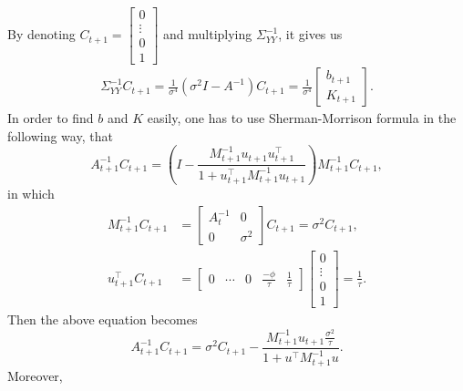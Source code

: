 By denoting $C_{t+1} = \left[ \begin{array}{c} 0\\\vdots \\ 0 \\ 1\end{array} \right]$ and multiplying $\Sigma_{YY}^{-1}$, it gives us
\begin{align*}
\Sigma_{YY}^{-1} C_{t+1}= \frac{1}{\sigma^4}(\sigma^2 I-A^{-1}) C_{t+1}= \frac{1}{\sigma^4} \left[\begin{matrix} b_{t+1} \\ K_{t+1} \end{matrix} \right].
\end{align*} 
In order to find $b$ and $K$ easily, one has to use Sherman-Morrison formula in the following way, that
\begin{equation}
A_{t+1}^{-1}C_{t+1} = \left( I - \frac{M_{t+1}^{-1}u_{t+1}u_{t+1}^\top }{1+u_{t+1}^\top M_{t+1}^{-1} u_{t+1}} \right)M_{t+1}^{-1}C_{t+1},
\end{equation}
in which
\begin{align*}
M_{t+1}^{-1}C_{t+1}    &=\left[ \begin{array}{cc} A_{t}^{-1} & 0 \\ 0 & \sigma^2 \end{array} \right]C_{t+1}=\sigma^2 C_{t+1},\\
u_{t+1}^\top C_{t+1} & = \left[ \begin{array}{ccccc} 0 & \cdots & 0 &\frac{-\phi}{\tau} & \frac{1}{\tau} \end{array} \right] \left[ \begin{array}{c} 0 \\ \vdots \\ 0\\ 1 \end{array} \right]= \frac{1}{\tau}.
\end{align*}
Then the above equation becomes
\begin{equation}
A_{t+1}^{-1}C_{t+1} = \sigma^2 C_{t+1}-\frac{M_{t+1}^{-1} u_{t+1} \frac{\sigma^2}{\tau}}{1+u^\top M_{t+1}^{-1} u}.
\end{equation}
Moreover,
